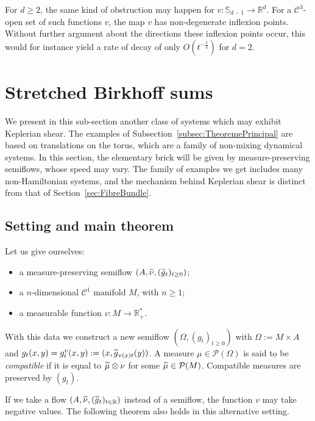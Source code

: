 \documentclass[10pt]{amsart}
\theoremstyle{definition}\newtheorem{defi}[theo]{Definition}\newtheorem{rema}[theo]{Remark}\newtheorem{exam}[theo]{Example}\newtheorem{exem}[theo]{Example}\newtheorem{nota}[theo]{Notation}
\newcommand{\R}{\mathbb{R}}
\newcommand{\Sbb}{\mathbb{S}}
\newcommand{\Ccal}{\mathcal{C}}
\newcommand{\Pcal}{\mathcal{P}}
\let\oldtilde\tilde
\renewcommand*{\tilde}[1]{\mathchoice{\widetilde{#1}}{\widetilde{#1}}{\oldtilde{#1}}{\oldtilde{#1}}}\let\oldhat\hat
\renewcommand*{\hat}[1]{\mathchoice{\widehat{#1}}{\widehat{#1}}{\oldhat{#1}}{\oldhat{#1}}}\let\oldforall\forall
\renewcommand*{\forall}{\mathrel{\oldforall}}
\begin{document}
For $d \geq 2$, the same kind of obstruction may happen for $v : \Sbb_{d-1} \to \R^d$. For a $\Ccal^3$-open set of such functions $v$, the map $v$ has non-degenerate inflexion points. Without further argument about the directions these inflexion points occur, this would for instance yield a rate of decay of only $O (t^{-\frac{1}{3}})$ for $d=2$.


\section{Stretched Birkhoff sums}\label{sec:StretchedBirkhoff}

We present in this sub-section another class of systems which may exhibit Keplerian shear. The examples of Subsection~\ref{subsec:TheoremePrincipal} are based on translations on the torus, which are a family of non-mixing dynamical systems. In this section, the elementary brick will be given by measure-preserving semiflows, whose speed may vary. The family of examples we get includes many non-Hamiltonian systems, and the mechanism behind Keplerian shear is distinct from that of Section~\ref{sec:FibreBundle}.


\subsection{Setting and main theorem}\label{subsec:AllongeTheoremePrincipal}

Let us give ourselves:
\begin{itemize}
\item a measure-preserving semiflow $(A, \tilde{\nu}, (\tilde{g}_t)_{t \geq 0})$;
\item a $n$-dimensional $\Ccal^1$ manifold $M$, with $n \geq 1$;
\item a measurable function $v : M \to \R_+^*$.
\end{itemize}
With this data we construct a new semiflow $(\Omega, (g_t)_{t \geq 0})$ with $\Omega := M \times A$ and $g_t (x,y) = g_t^v (x,y) := (x,\tilde{g}_{v(x)t} (y))$. A measure $\mu \in \Pcal (\Omega)$ is said to be \emph{compatible} if it is equal to $\tilde{\mu} \otimes \nu$ for some $\tilde{\mu} \in \Pcal (M)$. Compatible measures are preserved by $(g_t)$.


If we take a flow $(A, \tilde{\nu}, (\tilde{g}_t)_{t \in \R})$ instead of a semiflow, the function $v$ may take negative values. The following theorem also holds in this alternative setting.
\end{document}
